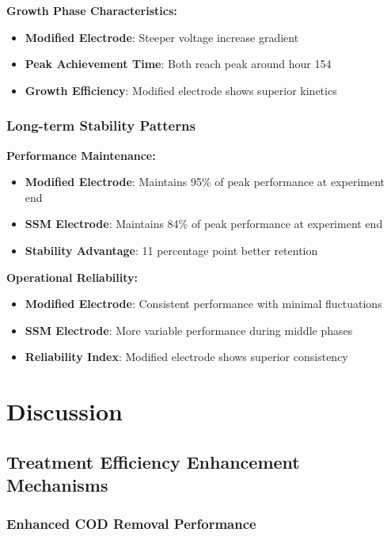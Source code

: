 \documentclass[12pt,a4paper]{article}
\begin{document}
\textbf{Growth Phase Characteristics:}
\begin{itemize}
    \item \textbf{Modified Electrode}: Steeper voltage increase gradient
    \item \textbf{Peak Achievement Time}: Both reach peak around hour 154
    \item \textbf{Growth Efficiency}: Modified electrode shows superior kinetics
\end{itemize}

\subsubsection{Long-term Stability Patterns}

\textbf{Performance Maintenance:}
\begin{itemize}
    \item \textbf{Modified Electrode}: Maintains 95\% of peak performance at experiment end
    \item \textbf{SSM Electrode}: Maintains 84\% of peak performance at experiment end
    \item \textbf{Stability Advantage}: 11 percentage point better retention
\end{itemize}

\textbf{Operational Reliability:}
\begin{itemize}
    \item \textbf{Modified Electrode}: Consistent performance with minimal fluctuations
    \item \textbf{SSM Electrode}: More variable performance during middle phases
    \item \textbf{Reliability Index}: Modified electrode shows superior consistency
\end{itemize}

\section{Discussion}

\subsection{Treatment Efficiency Enhancement Mechanisms}

\subsubsection{Enhanced COD Removal Performance}
\end{document}
